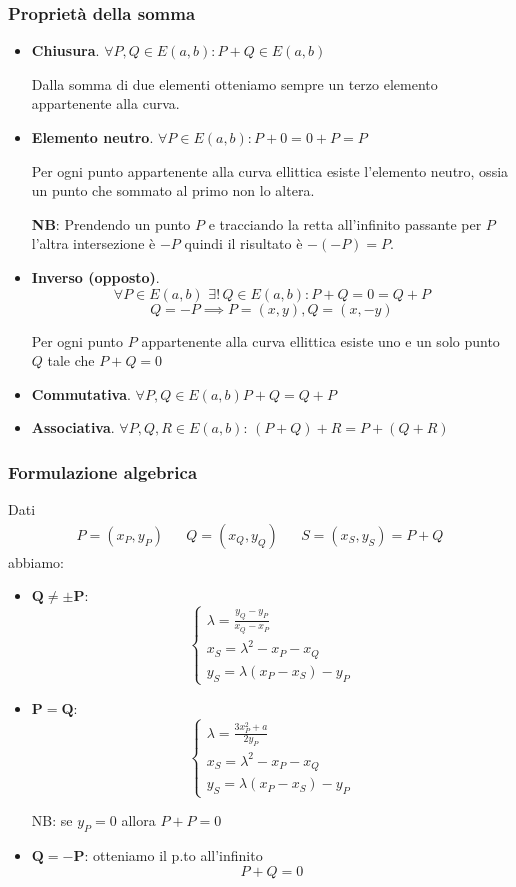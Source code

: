 \subsubsection{Proprietà della somma}
\begin{itemize}
	\item \textbf{Chiusura}. $\forall P, Q \in E(a,b): P+Q \in E(a,b) $
	
	Dalla somma di due elementi otteniamo sempre un terzo elemento appartenente alla curva. 
	
	\item \textbf{Elemento neutro}. $ \forall P \in E(a,b): P + 0 = 0 + P = P $
	
	Per ogni punto appartenente alla curva ellittica esiste l'elemento neutro, ossia un punto che sommato al primo non lo altera.
	
	\textbf{NB}: Prendendo un punto $P$ e tracciando la retta all'infinito passante per $P$ l'altra intersezione è $-P$ quindi il risultato è $-(-P) = P$.
	
	\item \textbf{Inverso (opposto)}. $$ \forall P \in E(a,b)\,\, \exists! \, Q \in E(a,b) : P + Q = 0 = Q + P$$
	$$ Q = -P \implies P = (x,y), Q = (x, -y) $$ 
	
	Per ogni punto $P$ appartenente alla curva ellittica esiste uno e un solo punto $Q$ tale che $P+Q=0$
	
	\item \textbf{Commutativa}. $\forall P, Q \in E(a,b) P + Q = Q + P $
	
	\item \textbf{Associativa}. $ \forall P, Q, R \in E(a,b):\, (P + Q) + R = P + (Q + R) $
\end{itemize}

\subsubsection{Formulazione algebrica}
Dati \begin{align*}
	P = (x_P, y_P)&&Q = (x_Q, y_Q)&&S = (x_S, y_S) = P+Q
\end{align*}
abbiamo:
\begin{itemize}
    \item $\mathbf{Q \neq \pm P}$:
    \[
        \begin{cases}
        	\lambda = \frac{y_Q - y_P}{x_Q - x_P}\\
            x_S = \lambda^{2} - x_P - x_Q \\
            y_S = \lambda(x_P - x_S) -y_P 
        \end{cases}
    \]
    \item $\mathbf{P = Q}$:
    \[
        \begin{cases}
        	\lambda = \frac{3x_P^{2} + a}{2y_P}\\
            x_S = \lambda^{2} - x_P - x_Q \\
            y_S = \lambda(x_P - x_S)-y_P 
        \end{cases}
    \]
    
    NB: se $y_P = 0$ allora $P+P=0$
    \item $\mathbf{Q = -P}$: otteniamo il p.to all'infinito $$P+Q = 0$$
\end{itemize}

